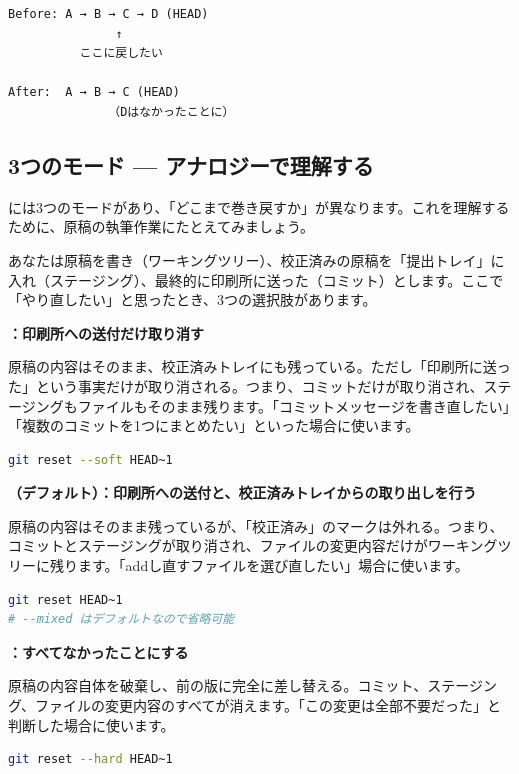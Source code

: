 \begin{lstlisting}[language={}]
Before: A → B → C → D (HEAD)
               ↑
          ここに戻したい

After:  A → B → C (HEAD)
              （Dはなかったことに）
\end{lstlisting}

\subsection{3つのモード — アナロジーで理解する}

 には3つのモードがあり、「どこまで巻き戻すか」が異なります。これを理解するために、原稿の執筆作業にたとえてみましょう。

あなたは原稿を書き（ワーキングツリー）、校正済みの原稿を「提出トレイ」に入れ（ステージング）、最終的に印刷所に送った（コミット）とします。ここで「やり直したい」と思ったとき、3つの選択肢があります。

\textbf{：印刷所への送付だけ取り消す}

原稿の内容はそのまま、校正済みトレイにも残っている。ただし「印刷所に送った」という事実だけが取り消される。つまり、コミットだけが取り消され、ステージングもファイルもそのまま残ります。「コミットメッセージを書き直したい」「複数のコミットを1つにまとめたい」といった場合に使います。

\begin{lstlisting}[language=bash]
git reset --soft HEAD~1
\end{lstlisting}

\textbf{（デフォルト）：印刷所への送付と、校正済みトレイからの取り出しを行う}

原稿の内容はそのまま残っているが、「校正済み」のマークは外れる。つまり、コミットとステージングが取り消され、ファイルの変更内容だけがワーキングツリーに残ります。「addし直すファイルを選び直したい」場合に使います。

\begin{lstlisting}[language=bash]
git reset HEAD~1
# --mixed はデフォルトなので省略可能
\end{lstlisting}

\textbf{：すべてなかったことにする}

原稿の内容自体を破棄し、前の版に完全に差し替える。コミット、ステージング、ファイルの変更内容のすべてが消えます。「この変更は全部不要だった」と判断した場合に使います。

\begin{lstlisting}[language=bash]
git reset --hard HEAD~1
\end{lstlisting}

